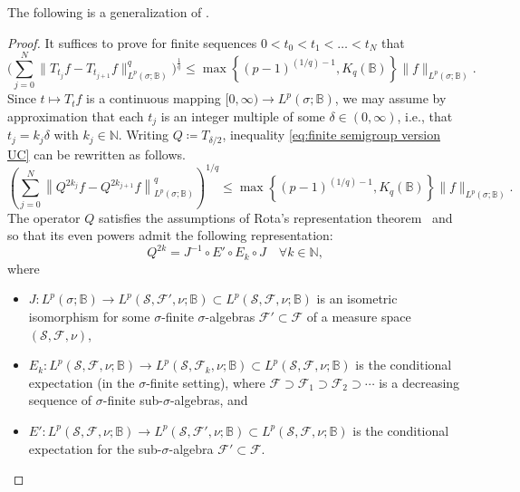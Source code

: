 \documentclass[11pt,reqno]{amsart}
\newcommand{\1}{\mathbf 1}
\newcommand{\Norm}[2]{\|#1\|_{#2}}
\begin{document}
The following is a generalization of \cite[Proposition 22]{hytonen2019heat}.
\begin{proof}
	It suffices to prove for finite sequences  $0<t_0<t_1<\ldots<t_N$  that
	\begin{equation}\label{eq:finite semigroup version UC}
		\bigg(\sum_{j=0}^N\Norm{T_{t_j}f-T_{t_{j+1}}f}{L^p(\sigma;\mathbb{B})}^q\bigg)^{\frac{1}{q}}\le \max\left\{\left(p-1\right)^{(1/q)-1},K_q\left(\mathbb{B}\right)\right\}\Norm{f}{L^p(\sigma;\mathbb{B})}.
	\end{equation}
	Since $t\mapsto T_t f$ is a continuous mapping $[0,\infty) \to L^p(\sigma;\mathbb{B})$, we may assume by approximation that each $t_j$ is an integer multiple of some $\delta\in (0,\infty)$, i.e., that  $t_j= k_j\delta$ with $k_j\in \mathbb{N}$. Writing $Q\coloneqq T_{\delta/2}$, inequality \eqref{eq:finite semigroup version UC} can be rewritten as follows.
	\begin{equation}\label{eq:Q version}
		\left(\sum_{j=0}^N\left\|Q^{2k_j}f-Q^{2k_{j+1}}f\right\|_{L^p(\sigma;\mathbb{B})}^q\right)^{1/q}\le \max\left\{\left(p-1\right)^{(1/q)-1},K_q\left(\mathbb{B}\right)\right\}\Norm{f}{L^p(\sigma;\mathbb{B})}.
	\end{equation}
	The operator $Q$ satisfies the assumptions of Rota's representation theorem~\cite{rota1962alternierende} and so that its even powers admit the following representation:
	\begin{equation}\label{eq:Q representation}
 Q^{2k}=J^{-1}\circ E'\circ E_k\circ J	\quad \forall k\in \mathbb{N},
	\end{equation}
	where
	\begin{itemize}
		\item  $J:L^p(\sigma;\mathbb{B})\to L^p(\mathscr{S},\mathscr{F}',\nu;\mathbb{B})\subset L^p(\mathscr{S},\mathscr{F},\nu;\mathbb{B})$ is an isometric isomorphism for some $\sigma$-finite $\sigma$-algebras $\mathscr{F}'\subset\mathscr F$ of a measure space $(\mathscr{S},\mathscr{F},\nu)$,
		\item $E_k:L^p(\mathscr{S},\mathscr{F},\nu;\mathbb{B})\to L^p(\mathscr{S},\mathscr{F}_k,\nu;\mathbb{B})\subset L^p(\mathscr{S},\mathscr{F},\nu;\mathbb{B})$ is the conditional expectation (in the $\sigma$-finite setting), where $\mathscr{F}\supset\mathscr{F}_1\supset\mathscr{F}_2\supset\cdots$ is a decreasing sequence of $\sigma$-finite sub-$\sigma$-algebras, and
		\item $E':L^p(\mathscr{S},\mathscr{F},\nu;\mathbb{B})\to L^p(\mathscr{S},\mathscr{F}',\nu;\mathbb{B})\subset L^p(\mathscr{S},\mathscr{F},\nu;\mathbb{B})$ is the conditional expectation for the sub-$\sigma$-algebra $\mathscr{F}'\subset\mathscr F$.

\end{itemize}
\end{proof}
\end{document}
